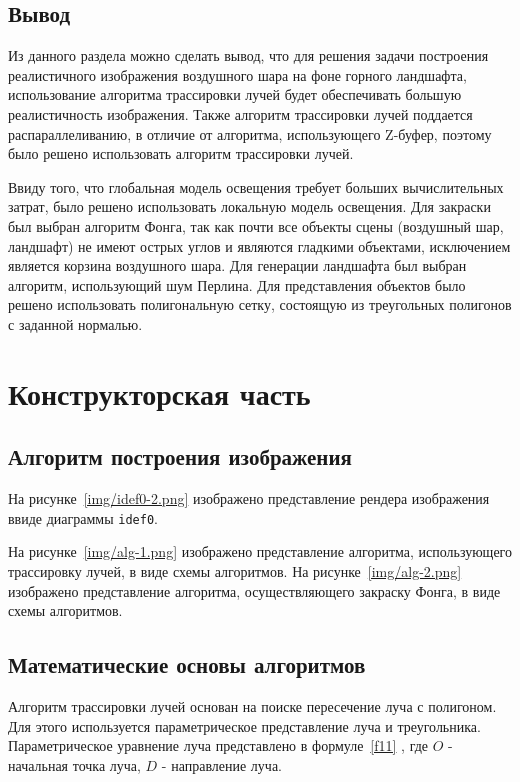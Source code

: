 
\section{Вывод}
Из данного раздела можно сделать вывод, что для решения задачи построения реалистичного изображения воздушного шара на фоне горного ландшафта, использование алгоритма трассировки лучей будет обеспечивать большую реалистичность изображения. Также алгоритм трассировки лучей поддается распараллеливанию, в отличие от алгоритма, использующего Z-буфер, поэтому было решено использовать алгоритм трассировки лучей. 

Ввиду того, что глобальная модель освещения требует больших вычислительных затрат, было решено использовать локальную модель освещения. Для закраски был выбран алгоритм Фонга, так как почти все объекты сцены (воздушный шар, ландшафт) не имеют острых углов и являются гладкими объектами, исключением является корзина воздушного шара. Для генерации ландшафта был выбран алгоритм, использующий шум Перлина. Для представления объектов было решено использовать полигональную сетку, состоящую из треугольных полигонов с заданной нормалью.

\chapter{Конструкторская часть}
\section{Алгоритм построения изображения}
На рисунке~\ref{img/idef0-2.png} изображено представление рендера изображения ввиде диаграммы \texttt{idef0}.

На рисунке~\ref{img/alg-1.png} изображено представление алгоритма, использующего трассировку лучей, в виде схемы алгоритмов. На рисунке~\ref{img/alg-2.png} изображено представление алгоритма, осуществляющего закраску Фонга, в виде схемы алгоритмов.



\section{Математические основы алгоритмов}
Алгоритм трассировки лучей основан на поиске пересечение луча с полигоном. Для этого используется параметрическое представление луча и треугольника.
Параметрическое уравнение луча представлено в формуле~\ref{f11} \cite{sherley}, где $O$ - начальная точка луча, $D$ - направление луча.

